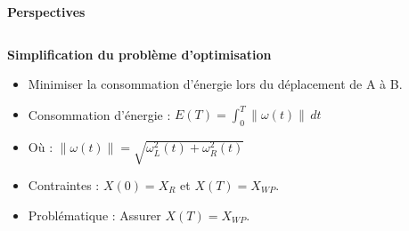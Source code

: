 \documentclass[aspectratio=169,10pt]{beamer}
\begin{document}
\begin{frame}{\textbf{Perspectives}}
    \begin{columns}[t]
        \begin{column}{0.55\textwidth}
            \textbf{Simplification du problème d'optimisation} \\
            \vspace{0.5em}
            \begin{itemize}
                \item Minimiser la consommation d'énergie lors du déplacement de A à B.
                \vspace{0.2cm}
                \item Consommation d'énergie : $\displaystyle E(T) = \int_{0}^{T} \| \omega(t) \| \, dt$
                \vspace{0.2cm}
                \item Où : $\| \omega(t) \| = \sqrt{\omega_L^{2}(t) + \omega_R^{2}(t)}$
                \vspace{0.2cm}
                \item Contraintes : \( X(0) = X_R \) et \( X(T) = X_{WP} \).
                \vspace{0.2cm}
                \item Problématique : Assurer \( X(T) = X_{WP} \).
            \end{itemize}
        \end{column}


\end{columns}
\end{frame}
\end{document}
